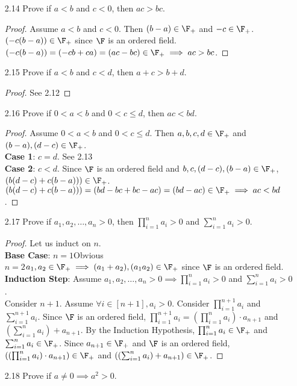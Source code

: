\documentclass[12pt]{article}
\begin{document}
\begin{enumerate}
\begin{proof}
			$(c(b-a))\in\F_+$ since $\F$ is an ordered field. $(c(b-a)) = (cb-ca) \in \F_+ \implies ac<bc$.
		\end{proof}
		\item[2.14] Prove if $a<b$ and $c<0$, then $ac>bc$.
		\begin{proof}
			Assume $a<b$ and $c<0$. Then $(b-a)\in\F_+$ and $-c\in\F_+$.
			$(-c(b-a))\in\F_+$ since $\F$ is an ordered field. $(-c(b-a)) = (-cb+ca) = (ac-bc) \in \F_+ \implies ac>bc$.
		\end{proof}
		\item[2.15] Prove if $a<b$ and $c<d$, then $a+c>b+d$.
		\begin{proof}
			See 2.12
		\end{proof}
		\item[2.16] Prove if $0<a<b$ and $0<c\leq d$, then $ac<bd$.
		\begin{proof}
			Assume $0<a<b$ and $0<c\leq d$. Then $a,b,c,d\in\F_+$ and $(b-a),(d-c)\in\F_+$.
			\\\textbf{Case 1}: $c=d$. See 2.13
			\\\textbf{Case 2}: $c<d$.
			 Since $\F$ is an ordered field and $b,c,(d-c),(b-a)\in\F_+$, $(b(d-c)+c(b-a)))\in\F_+$. $(b(d-c)+c(b-a))) = (bd-bc+bc-ac) = (bd-ac) \in \F_+ \implies ac<bd$.
		\end{proof}
		\item[2.17] Prove if $a_1,a_2,\ldots,a_n>0$, then $\prod_{i=1}^{n}a_i > 0$ and $\sum_{i=1}^{n}a_i > 0$.
		\begin{proof}
			Let us induct on $n$.
			\\\textbf{Base Case}: $n=1$\qquad Obvious\\
			$n=2$\qquad $a_1,a_2\in\F_+ \implies (a_1+a_2),(a_1a_2)\in\F_+$ since $\F$ is an ordered field.
			\\\textbf{Induction Step}: Assume $a_1,a_2,\ldots,a_n>0 \implies \prod_{i=1}^{n}a_i > 0$ and $\sum_{i=1}^{n}a_i > 0$.\\
			Consider $n+1$. Assume $\forall i\in [n+1], a_i>0$. Consider $\prod_{i=1}^{n+1}a_i$ and $\sum_{i=1}^{n+1}a_i$. Since $\F$ is an ordered field, $\prod_{i=1}^{n+1}a_i = (\prod_{i=1}^{n}a_i) \cdot a_{n+1}$ and $(\sum_{i=1}^{n}a_i) + a_{n+1}$. By the Induction Hypothesis, $\prod_{i=1}^{n}a_i \in \F_+$ and $\sum_{i=1}^{n}a_i \in \F_+$. Since $a_{n+1}\in\F_+$ and $\F$ is an ordered field, $((\prod_{i=1}^{n}a_i) \cdot a_{n+1})\in\F_+$ and $((\sum_{i=1}^{n}a_i) + a_{n+1})\in\F_+$.
		\end{proof}
		\item[2.18] Prove if $a \neq 0 \implies a^2 > 0$.

\end{enumerate}
\end{document}

